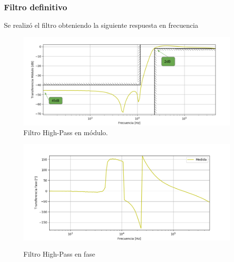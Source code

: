 \subsubsection{Filtro definitivo}
Se realizó el filtro obteniendo la siguiente respuesta en frecuencia 
\begin{figure}[H]
	\centering
	\includegraphics[width=\textwidth]{Imagenes-Ej3/BodeSedra.png}
	\caption{Filtro High-Pass en módulo.}
	\label{fig:BodeSedra}
\end{figure}
\begin{figure}[H]
	\centering
	\includegraphics[width=\textwidth]{Imagenes-Ej3/FaseBodeSedra.png}
	\label{fig:FaseBodeSedra}
	\caption{Filtro High-Pass en fase}
\end{figure}

